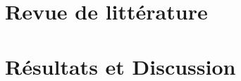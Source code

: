 \documentclass{ifri}
\begin{document}
\pagecolor{white}







\newpage







\setcounter{page}{1}

\fancyhead[L]{\tiny \leftmark}
\fancyhead[R]{\scriptsize \rightmark}
\fancyfoot[C]{\thepage}

\chapter{Revue de littérature}\label{chap:1}


\chapter{Résultats et Discussion}\label{chap:3}


% 

% 


%
\end{document}
